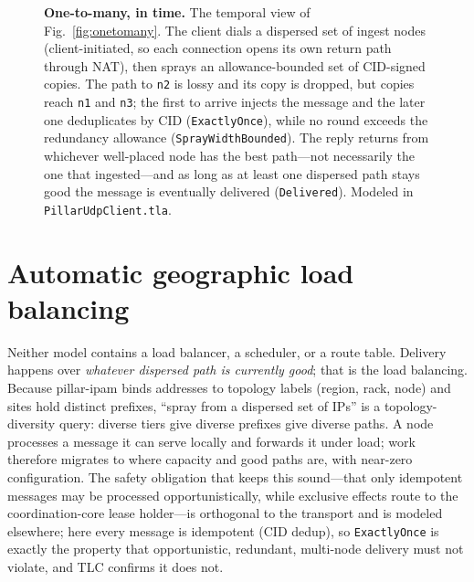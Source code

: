 \documentclass[10pt,twocolumn]{article}
\newcommand{\code}[1]{\texttt{\small #1}}
\begin{document}
\begin{figure}[t]
\caption{\textbf{One-to-many, in time.} The temporal view of
Fig.~\ref{fig:onetomany}. The client dials a dispersed set of ingest nodes
(client-initiated, so each connection opens its own return path through NAT),
then sprays an allowance-bounded set of CID-signed copies. The path to
\code{n2} is lossy and its copy is dropped, but copies reach \code{n1} and
\code{n3}; the first to arrive injects the message and the later one deduplicates
by CID (\code{ExactlyOnce}), while no round exceeds the redundancy allowance
(\code{SprayWidthBounded}). The reply returns from whichever well-placed node has
the best path---not necessarily the one that ingested---and as long as at least
one dispersed path stays good the message is eventually delivered
(\code{Delivered}). Modeled in \code{PillarUdpClient.tla}.}
\label{fig:onetomany-seq}
\end{figure}

\section{Automatic geographic load balancing}
Neither model contains a load balancer, a scheduler, or a route table. Delivery
happens over \emph{whatever dispersed path is currently good}; that is the load
balancing. Because pillar-ipam binds addresses to topology labels (region,
rack, node) and sites hold distinct prefixes, ``spray from a dispersed set of
IPs'' is a topology-diversity query: diverse tiers give diverse prefixes give
diverse paths. A node processes a message it can serve locally and forwards it
under load; work therefore migrates to where capacity and good paths are, with
near-zero configuration. The safety obligation that keeps this sound---that only
idempotent messages may be processed opportunistically, while exclusive effects
route to the coordination-core lease holder---is orthogonal to the transport and
is modeled elsewhere; here every message is idempotent (CID dedup), so
\code{ExactlyOnce} is exactly the property that opportunistic, redundant,
multi-node delivery must not violate, and TLC confirms it does not.
\end{document}
